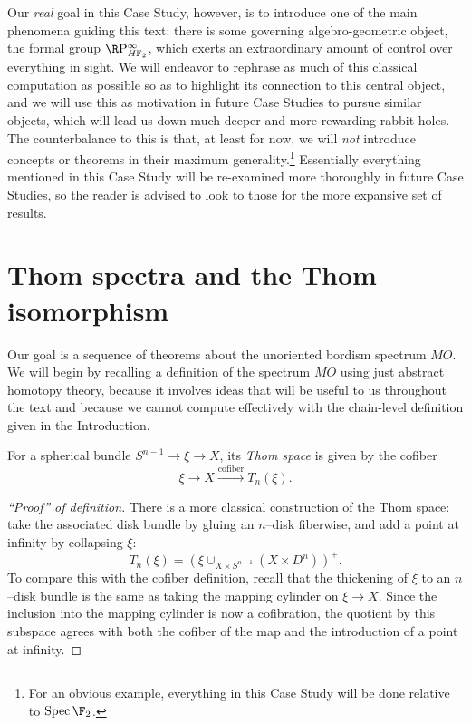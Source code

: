 Our \emph{real} goal in this Case Study, however, is to introduce one of the main phenomena guiding this text: there is some governing algebro-geometric object, the formal group \(\RP^\infty_{\HFtwo}\), which exerts an extraordinary amount of control over everything in sight.  We will endeavor to rephrase as much of this classical computation as possible so as to highlight its connection to this central object, and we will use this as motivation in future Case Studies to pursue similar objects, which will lead us down much deeper and more rewarding rabbit holes.  The counterbalance to this is that, at least for now, we will \emph{\emph{not}} introduce concepts or theorems in their maximum generality.\footnote{For an obvious example, everything in this Case Study will be done relative to \(\Spec \F_2\).}  Essentially everything mentioned in this Case Study will be re-examined more thoroughly in future Case Studies, so the reader is advised to look to those for the more expansive set of results.






\section{Thom spectra and the Thom isomorphism}\label{LectureThomSpectra}

Our goal is a sequence of theorems about the unoriented bordism spectrum \(MO\).  We will begin by recalling a definition of the spectrum \(MO\) using just abstract homotopy theory, because it involves ideas that will be useful to us throughout the text and because we cannot compute effectively with the chain-level definition given in the Introduction.

\begin{definition}
For a spherical bundle \(S^{n-1} \to \xi \to X\), its \textit{Thom space} is given by the cofiber \[\xi \to X \xrightarrow{\text{cofiber}} T_n(\xi).\]
\end{definition}
\begin{proof}[``Proof'' of definition]
There is a more classical construction of the Thom space: take the associated disk bundle by gluing an \(n\)--disk fiberwise, and add a point at infinity by collapsing \(\xi\): \[T_n(\xi) = (\xi \cup_{X \times S^{n-1}} (X \times D^n))^+.\]  To compare this with the cofiber definition, recall that the thickening of \(\xi\) to an \(n\)--disk bundle is the same as taking the mapping cylinder on \(\xi \to X\).  Since the inclusion into the mapping cylinder is now a cofibration, the quotient by this subspace agrees with both the cofiber of the map and the introduction of a point at infinity.
\end{proof}

